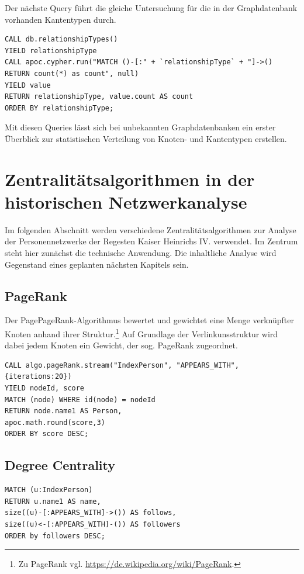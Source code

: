 \documentclass[ngerman,]{scrreprt}
\begin{document}
Der nächste Query führt die gleiche Untersuchung für die in der Graphdatenbank vorhanden Kantentypen durch.

\begin{verbatim}
CALL db.relationshipTypes()
YIELD relationshipType
CALL apoc.cypher.run("MATCH ()-[:" + `relationshipType` + "]->()
RETURN count(*) as count", null)
YIELD value
RETURN relationshipType, value.count AS count
ORDER BY relationshipType;
\end{verbatim}

Mit diesen Queries lässt sich bei unbekannten Graphdatenbanken ein erster Überblick zur statistischen Verteilung von Knoten- und Kantentypen erstellen.

\section{Zentralitätsalgorithmen in der historischen Netzwerkanalyse}\label{zentralituxe4tsalgorithmen-in-der-historischen-netzwerkanalyse}

Im folgenden Abschnitt werden verschiedene Zentralitätsalgorithmen zur Analyse der Personennetzwerke der Regesten Kaiser Heinrichs IV. verwendet. Im Zentrum steht hier zunächst die technische Anwendung. Die inhaltliche Analyse wird Gegenstand eines geplanten nächsten Kapitels sein.

\subsection{PageRank}\label{pagerank}

Der PagePageRank-Algorithmus bewertet und gewichtet eine Menge verknüpfter Knoten anhand ihrer Struktur.\footnote{Zu PageRank vgl. \url{https://de.wikipedia.org/wiki/PageRank}.} Auf Grundlage der Verlinkunsstruktur wird dabei jedem Knoten ein Gewicht, der sog. PageRank zugeordnet.

\begin{verbatim}
CALL algo.pageRank.stream("IndexPerson", "APPEARS_WITH",
{iterations:20})
YIELD nodeId, score
MATCH (node) WHERE id(node) = nodeId
RETURN node.name1 AS Person,
apoc.math.round(score,3)
ORDER BY score DESC;
\end{verbatim}

\subsection{Degree Centrality}\label{degree-centrality}

\begin{verbatim}
MATCH (u:IndexPerson)
RETURN u.name1 AS name,
size((u)-[:APPEARS_WITH]->()) AS follows,
size((u)<-[:APPEARS_WITH]-()) AS followers
ORDER by followers DESC;
\end{verbatim}
\end{document}
